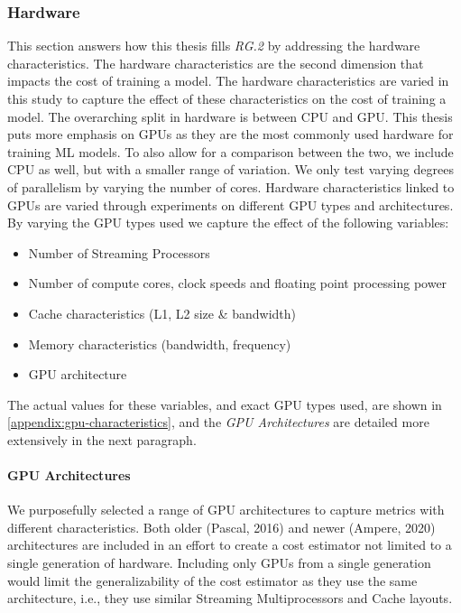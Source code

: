 \subsubsection{Hardware}
\label{subsubsec:4-hardware}
This section answers how this thesis fills \emph{RG.2} by addressing the hardware characteristics. The hardware characteristics are the second dimension that impacts the cost of training a model. The hardware characteristics are varied in this study to capture the effect of these characteristics on the cost of training a model. The overarching split in hardware is between CPU and GPU. This thesis puts more emphasis on GPUs as they are the most commonly used hardware for training ML models. To also allow for a comparison between the two, we include CPU as well, but with a smaller range of variation. We only test varying degrees of parallelism by varying the number of cores. Hardware characteristics linked to GPUs are varied through experiments on different GPU types and architectures. By varying the GPU types used we capture the effect of the following variables:
\begin{itemize}
    \item Number of Streaming Processors
    \item Number of compute cores, clock speeds and floating point processing power
    \item Cache characteristics (L1, L2 size \& bandwidth)
    \item Memory characteristics (bandwidth, frequency)
    \item GPU architecture
\end{itemize}
The actual values for these variables, and exact GPU types used, are shown in \autoref{appendix:gpu-characteristics}, and the \textit{GPU Architectures} are detailed more extensively in the next paragraph.

\paragraph{GPU Architectures}
We purposefully selected a range of GPU architectures to capture metrics with different characteristics. Both older (Pascal, 2016) and newer (Ampere, 2020) architectures are included in an effort to create a cost estimator not limited to a single generation of hardware. Including only GPUs from a single generation would limit the generalizability of the cost estimator as they use the same architecture, i.e., they use similar Streaming Multiprocessors and Cache layouts.


